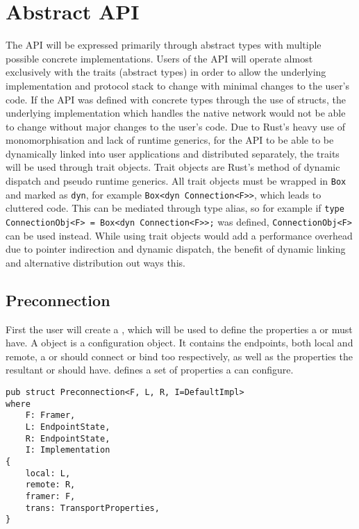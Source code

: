 \section{Abstract API}\label{sec:abstract-api}
The API will be expressed primarily through abstract types with multiple possible concrete implementations.
Users of the API will operate almost exclusively with the traits (abstract types) in order to allow the underlying
implementation and protocol stack to change with minimal changes to the user's code.
If the API was defined with concrete types through the use of structs, the underlying implementation which handles
the native network would not be able to change without major changes to the user's code.
Due to Rust's heavy use of monomorphisation and lack of runtime generics, for the API to be able to be dynamically
linked into user applications and distributed separately, the traits will be used through trait objects.
Trait objects are Rust's method of dynamic dispatch and pseudo runtime generics.
All trait objects must be wrapped in \texttt{Box} and marked as \texttt{dyn}, for example
\texttt{Box<dyn Connection<F>>}, which leads to cluttered code.
This can be mediated through type alias, so for example if \texttt{type ConnectionObj<F> = Box<dyn Connection<F>>;} was
defined, \texttt{ConnectionObj<F>} can be used instead.
While using trait objects would add a performance overhead due to pointer indirection and dynamic dispatch, the benefit
of dynamic linking and alternative distribution out ways this.

\subsection{Preconnection}\label{subsec:preconnection}
First the user will create a \preconnection{}, which will be used to define the properties a \connection or \listener
must have.
A \preconnection{} object is a configuration object.
It contains the endpoints, both local and remote, a \connection{} or \listener{} should connect or bind too
respectively, as well as the properties the resultant \connection{} or \listener{} should have.
\cite[§~5.2]{trammell_abstractapplicationlayer_2020} defines a set of properties a \preconnection{} can
configure.

\begin{lstlisting}[float=h, label=lst:preconnection, caption={The Preconnection struct, showing the four
generic parameters.}]
pub struct Preconnection<F, L, R, I=DefaultImpl>
where
    F: Framer,
    L: EndpointState,
    R: EndpointState,
    I: Implementation
{
    local: L,
    remote: R,
    framer: F,
    trans: TransportProperties,
}
\end{lstlisting}

